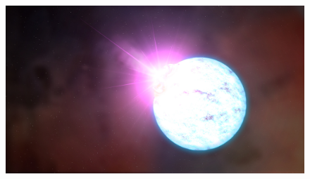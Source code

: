 \documentclass[12pt, aspectratio=169]{beamer}
\begin{document}
\begin{frame}
  
\begin{figure}
\includegraphics[width=\textwidth]{SGRart.jpg}
\end{figure}

\end{frame}
\end{document}
